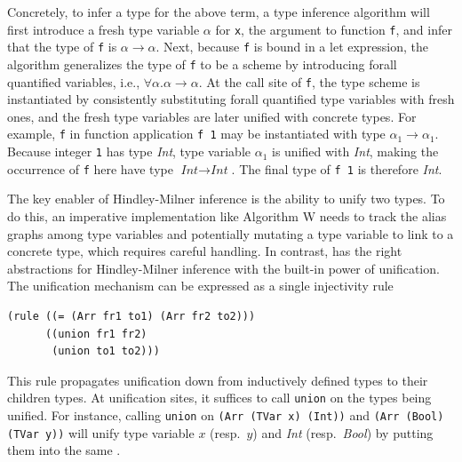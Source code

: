 Concretely,
 to infer a type for the above term,
 a type inference algorithm will first introduce a fresh type variable $\alpha$ for \lstinline{x},
 the argument to function \lstinline{f}, and infer that
 the type of \lstinline{f} is $\alpha\rightarrow\alpha$.
Next, because \lstinline{f} is bound in a let expression,
 the algorithm generalizes the type of \lstinline{f} to be a scheme by introducing forall quantified
 variables, i.e., $\forall \alpha.\alpha\rightarrow\alpha$.
At the call site of \lstinline{f},
 the type scheme is instantiated by consistently substituting forall quantified type variables with fresh ones,
 and the fresh type variables are later unified with concrete types.
For example, \lstinline{f} in function application \lstinline{f 1}
 may be instantiated with type $\alpha_1\rightarrow\alpha_1$.
Because integer \lstinline{1} has type \textit{Int},
 type variable $\alpha_1$ is unified with \textit{Int},
 making the occurrence of \lstinline{f} here
 have type $\textit{Int}\rightarrow\textit{Int}$.
The final type of \lstinline{f 1} is therefore \textit{Int}.

The key enabler of Hindley-Milner inference
 is the ability to unify two types.
To do this,
 an imperative implementation like Algorithm W \citep{hindley-milner} needs
 to track the alias graphs among type variables
 and potentially mutating a type variable
 to link to a concrete type,
 which requires careful handling.
In contrast, \egglog has the right abstractions for Hindley-Milner inference
 with the built-in power of unification.
The unification mechanism can be expressed as a single injectivity rule
\begin{lstlisting}[language=egglog]
(rule ((= (Arr fr1 to1) (Arr fr2 to2)))
      ((union fr1 fr2)
       (union to1 to2)))
\end{lstlisting}
This rule propagates unification down
 from inductively defined types to their children types.
At unification sites,
 it suffices to call \lstinline[language=egglog]{union}
 on the types being unified.
For instance, calling \lstinline[language=egglog]{union} on
\lstinline{(Arr (TVar x) (Int))} and \lstinline{(Arr (Bool) (TVar y))}
 will unify type variable $x$ (resp.\ $y$) and \textit{Int} (resp.\ \textit{Bool})
 by putting them into the same \eclass.

